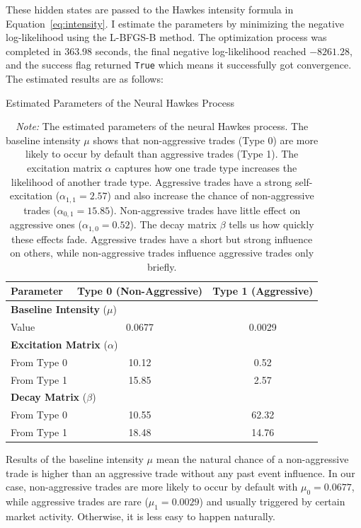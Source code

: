 These hidden states are passed to the Hawkes intensity formula in Equation~\ref{eq:intensity}. I estimate the parameters by minimizing the negative log-likelihood using the L-BFGS-B method. The optimization process was completed in 363.98 seconds, the final negative log-likelihood reached $-8261.28$, and the success flag returned \texttt{True} which means it successfully got convergence. The estimated results are as follows:
\begin{table}[tbp]
    \centering
    \caption{Estimated Parameters of the Neural Hawkes Process}
    \caption*{\textit{Note:} The estimated parameters of the neural Hawkes process. The baseline intensity $\mu$ shows that non-aggressive trades (Type 0) are more likely to occur by default than aggressive trades (Type 1). The excitation matrix $\alpha$ captures how one trade type increases the likelihood of another trade type. Aggressive trades have a strong self-excitation ($\alpha_{1,1} = 2.57$) and also increase the chance of non-aggressive trades ($\alpha_{0,1} = 15.85$). Non-aggressive trades have little effect on aggressive ones ($\alpha_{1,0} = 0.52$). The decay matrix $\beta$ tells us how quickly these effects fade. Aggressive trades have a short but strong influence on others, while non-aggressive trades influence aggressive trades only briefly.}
    \label{tb:hawkes-params}
    \begin{tabular}{lcc}
    \toprule
    \textbf{Parameter} & \textbf{Type 0 (Non-Aggressive)} & \textbf{Type 1 (Aggressive)} \\
    \midrule
    \multicolumn{3}{l}{\textbf{Baseline Intensity} (\( \mu \))} \\
    \quad Value & 0.0677 & 0.0029 \\
    \midrule
    \multicolumn{3}{l}{\textbf{Excitation Matrix} (\( \alpha \))} \\
    \quad From Type 0 & 10.12 & 0.52 \\
    \quad From Type 1 & 15.85 & 2.57 \\
    \midrule
    \multicolumn{3}{l}{\textbf{Decay Matrix} (\( \beta \))} \\
    \quad From Type 0 & 10.55 & 62.32 \\
    \quad From Type 1 & 18.48 & 14.76 \\
    \bottomrule
    \end{tabular}
\end{table}

Results of the baseline intensity $\mu$ mean the natural chance of a non-aggressive trade is higher than an aggressive trade without any past event influence. In our case, non-aggressive trades are more likely to occur by default with $\mu_0 = 0.0677$, while aggressive trades are rare ($\mu_1 = 0.0029$) and usually triggered by certain market activity.  Otherwise, it is less easy to happen naturally.

